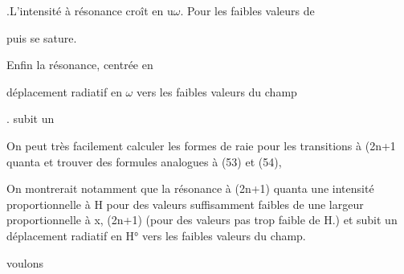 .L'intensité à résonance croît en u$\omega$. Pour les faibles valeurs de

puis se sature.

Enfin la résonance, centrée en 

déplacement radiatif en $\omega$ vers les faibles valeurs du champ

. subit un

On peut très facilement calculer les formes de raie pour les transitions à (2n+1 quanta
et trouver des formules analogues à (53) et (54),

On montrerait notamment que la résonance à (2n+1) quanta  une intensité
proportionnelle à H pour des valeurs suffisamment faibles de  une
largeur proportionnelle à x, (2n+1) (pour des valeurs pas trop faible de H.)
et subit un déplacement radiatif en H° vers les faibles valeurs du champ.

voulons

